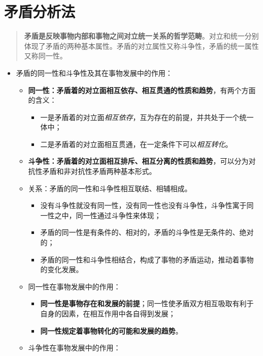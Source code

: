 \documentclass[
]{article}
\begin{document}
\hypertarget{ux77dbux76feux5206ux6790ux6cd5}{%
\section{矛盾分析法}\label{ux77dbux76feux5206ux6790ux6cd5}}

\begin{quote}
\textbf{矛盾是反映事物内部和事物之间对立统一关系的哲学范畴}。对立和统一分别体现了矛盾的两种基本属性。矛盾的对立属性又称斗争性，矛盾的统一属性又称同一性。
\end{quote}

\begin{itemize}
\item
  矛盾的同一性和斗争性及其在事物发展中的作用：

  \begin{itemize}
  \item
    \textbf{同一性：矛盾着的对立面相互依存、相互贯通的性质和趋势}，有两个方面的含义：

    \begin{itemize}
    \item
      一是矛盾着的对立面\emph{相互依存}，互为存在的前提，并共处于一个统一体中；
    \item
      二是矛盾着的对立面相互贯通，在一定条件下可以\emph{相互转化}。
    \end{itemize}
  \item
    \textbf{斗争性：矛盾着的对立面相互排斥、相互分离的性质和趋势}，可以分为对抗性矛盾和非对抗性矛盾两种基本形式。
  \item
    关系：矛盾的同一性和斗争性相互联结、相辅相成。

    \begin{itemize}
    \item
      没有斗争性就没有同一性，没有同一性也没有斗争性，斗争性寓于同一性之中，同一性通过斗争性来体现；
    \item
      矛盾的同一性是有条件的、相对的，矛盾的斗争性是无条件的、绝对的；
    \item
      矛盾的同一性和斗争性相结合，构成了事物的矛盾运动，推动着事物的变化发展。
    \end{itemize}
  \item
    同一性在事物发展中的作用：

    \begin{itemize}
    \item
      \textbf{同一性是事物存在和发展的前提}；同一性使矛盾双方相互吸取有利于自身的因素，在相互作用中各自得到发展；
    \item
      \textbf{同一性规定着事物转化的可能和发展的趋势}。
    \end{itemize}
  \item
    斗争性在事物发展中的作用：


\end{itemize}
\end{itemize}
\end{document}
